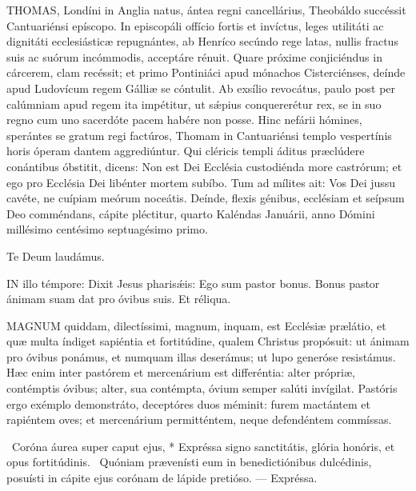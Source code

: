 \lettrine[lines=2]{T}{HOMAS}, Londíni in Anglia natus, ántea regni cancellárius, Theobáldo succéssit Cantuariénsi epíscopo. In episcopáli offício fortis et invíctus, leges utilitáti ac dignitáti ecclesiásticæ repugnántes, ab Henríco secúndo rege latas, nullis fractus suis ac suórum incómmodis, acceptáre rénuit. Quare próxime conjiciéndus in cárcerem, clam recéssit; et primo Pontiniáci apud mónachos Cisterciénses, deínde apud Ludovícum regem Gálliæ se cóntulit. Ab exsílio revocátus, paulo post per calúmniam apud regem ita impétitur, ut sǽpius conquererétur rex, se in suo regno cum uno sacerdóte pacem habére non posse. Hinc nefárii hómines, sperántes se gratum regi factúros, Thomam in Cantuariénsi templo vespertínis horis óperam dantem aggrediúntur. Qui cléricis templi áditus præclúdere conántibus óbstitit, dicens: Non est Dei Ecclésia custodiénda more castrórum; et ego pro Ecclésia Dei libénter mortem subíbo. Tum ad mílites ait: Vos Dei jussu cavéte, ne cuípiam meórum noceátis. Deínde, flexis génibus, ecclésiam et seípsum Deo comméndans, cápite pléctitur, quarto Kaléndas Januárii, anno Dómini millésimo centésimo septuagésimo primo.

Te Deum laudámus.




\lettrine[lines=2]{I}{N} illo témpore: Dixit Jesus pharisǽis: Ego sum pastor bonus. Bonus pastor ánimam suam dat pro óvibus suis. Et réliqua.



\lettrine[lines=2]{M}{AGNUM} quiddam, dilectíssimi, magnum, inquam, est Ecclésiæ prælátio, et quæ multa índiget sapiéntia et fortitúdine, qualem Christus propósuit: ut ánimam pro óvibus ponámus, et numquam illas deserámus; ut lupo generóse resistámus. Hæc enim inter pastórem et mercenárium est differéntia: alter própriæ, contémptis óvibus; alter, sua contémpta, óvium semper salúti invígilat. Pastóris ergo exémplo demonstráto, deceptóres duos méminit: furem mactántem et rapiéntem oves; et mercenárium permitténtem, neque defendéntem commíssas.

\R\ Coróna áurea super caput ejus, * Expréssa signo sanctitátis, glória honóris, et opus fortitúdinis. \V\ Quóniam prævenísti eum in benedictiónibus dulcédinis, posuísti in cápite ejus corónam de lápide pretióso. --- Expréssa.


